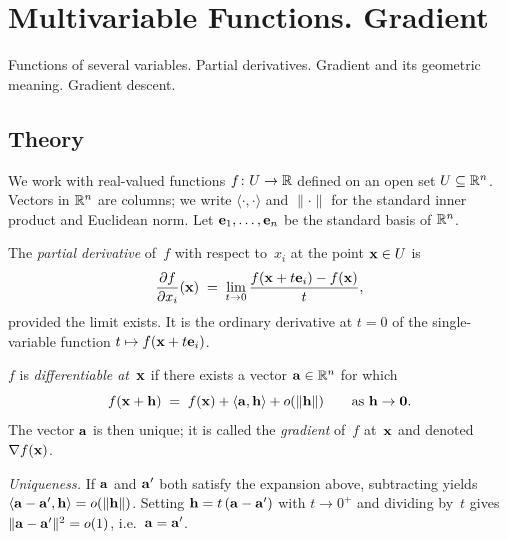 
\section{Multivariable Functions. Gradient}
\label{sec:1.1.10-multivariable}

\begin{ticket}
Functions of several variables. Partial derivatives. Gradient and its geometric meaning. Gradient descent.
\end{ticket}

\subsection*{Theory}

We work with real-valued functions $f \colon U \to \mathbb{R}$ defined on an
open set $U \subseteq \mathbb{R}^n$. Vectors in $\mathbb{R}^n$ are columns; we write
$\langle \cdot, \cdot \rangle$ and $\|\cdot\|$ for the standard inner
product and Euclidean norm. Let $\mathbf{e}_1, \dots, \mathbf{e}_n$ be the
standard basis of $\mathbb{R}^n$.

\begin{definition}
\label{def:partial-derivative}
The \emph{partial derivative} of~$f$ with respect to~$x_i$ at the
point $\mathbf{x} \in U$ is
\[
  \frac{\partial f}{\partial x_i}(\mathbf{x})
  \;=\; \lim_{t \to 0} \frac{f(\mathbf{x} + t\mathbf{e}_i) - f(\mathbf{x})}{t},
\]
provided the limit exists. It is the ordinary derivative at $t = 0$ of
the single-variable function $t \mapsto f(\mathbf{x} + t \mathbf{e}_i)$.
\end{definition}

\begin{definition}
\label{def:differentiable-multi}
$f$ is \emph{differentiable at~$\mathbf{x}$} if there exists a vector
$\mathbf{a} \in \mathbb{R}^n$ for which
\[
  f(\mathbf{x} + \mathbf{h}) \;=\; f(\mathbf{x}) + \langle \mathbf{a}, \mathbf{h} \rangle + o(\|\mathbf{h}\|)
  \qquad \text{as } \mathbf{h} \to \mathbf{0}.
\]
The vector $\mathbf{a}$ is then unique; it is called the \emph{gradient}
of~$f$ at~$\mathbf{x}$ and denoted $\nabla f(\mathbf{x})$.

\emph{Uniqueness.} If $\mathbf{a}$ and $\mathbf{a}'$ both satisfy the
expansion above, subtracting yields
$\langle \mathbf{a} - \mathbf{a}', \mathbf{h} \rangle = o(\|\mathbf{h}\|)$.
Setting $\mathbf{h} = t\,(\mathbf{a} - \mathbf{a}')$ with $t \to 0^{+}$ and
dividing by~$t$ gives $\|\mathbf{a} - \mathbf{a}'\|^2 = o(1)$, i.e.\
$\mathbf{a} = \mathbf{a}'$.
\end{definition}

